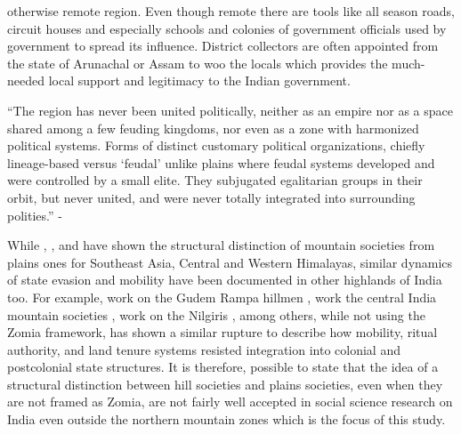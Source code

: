 \begin{sloppypar}
otherwise remote region. Even though remote there are tools like all season roads, circuit houses and especially schools and colonies of government officials used by government to spread its influence. District collectors are often appointed from the state of Arunachal or Assam to woo the locals which provides the much-needed local support and legitimacy to the Indian government.  

\vspace{0.3cm}

 \enquote{The region has never been united politically, neither as an empire nor as a space shared among a few feuding kingdoms, nor even as a zone with harmonized political systems. Forms of distinct customary political organizations, chiefly lineage-based versus \enquote{feudal} unlike plains where feudal systems developed and were controlled by a small elite. They subjugated egalitarian groups in their orbit, but never united, and were never totally integrated into surrounding polities.} - \citep{michaud2017s}

\vspace{0.3cm}
While \cite{jamesscott}, \cite{shneiderman2010central}  , and \cite{alam2008becoming} have shown the structural distinction of mountain societies from plains ones for Southeast Asia, Central and Western Himalayas, similar dynamics of state evasion and mobility have been documented in other highlands of India too. For example, \cite{arnold1982rebellious} work on the Gudem Rampa hillmen , \cite{sundar2001debating,sundar2005custom} work the central India mountain societies , \cite{cederlof2002narratives} work on the Nilgiris , among others, while not using the Zomia framework, has shown a similar rupture to describe how mobility, ritual authority, and land tenure systems resisted integration into colonial and postcolonial state structures. It is therefore, possible to state that the idea of a structural distinction between hill societies and plains societies, even when they are not framed as Zomia, are not fairly well accepted in social science research on India even outside the northern mountain zones which is the focus of this study.



\end{sloppypar}
